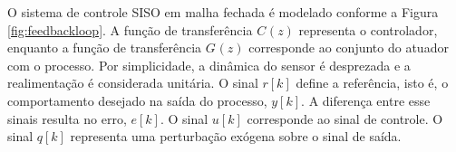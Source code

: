 \documentclass[repeatfields,oneside,overleaf]{tcc}
\newcommand{\myC}[2][]{ C_{#1} \left( #2 \right) }
\newcommand{\myG}[2][]{ G_{#1} \left( #2 \right) }
\begin{document}
O sistema de controle SISO em malha fechada é modelado conforme a Figura \ref{fig:feedbackloop}.
A função de transferência $\myC{z}$ representa o controlador, enquanto a função de transferência $\myG{z}$ corresponde ao conjunto do atuador com o processo.
Por simplicidade, a dinâmica do sensor é desprezada e a realimentação é considerada unitária.
O sinal $r[k]$ define a referência, isto é, o comportamento desejado na saída do processo, $y[k]$.
A diferença entre esse sinais resulta no erro, $e[k]$.
O sinal $u[k]$ corresponde ao sinal de controle.
O sinal $q[k]$ representa uma perturbação exógena sobre o sinal de saída.





\end{document}
